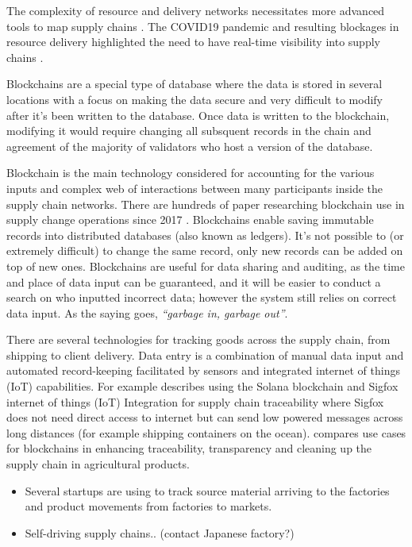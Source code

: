 \documentclass[
  letterpaper,
  DIV=11,
  numbers=noendperiod]{scrartcl}
\begin{document}
The complexity of resource and delivery networks necessitates more
advanced tools to map supply chains
\citep{knightFutureBusinessRole2022}. The COVID19 pandemic and resulting
blockages in resource delivery highlighted the need to have real-time
visibility into supply chains \citep{finkenstadtBlurryVisionSupply2021}.

Blockchains are a special type of database where the data is stored in
several locations with a focus on making the data secure and very
difficult to modify after it's been written to the database. Once data
is written to the blockchain, modifying it would require changing all
subsquent records in the chain and agreement of the majority of
validators who host a version of the database.

Blockchain is the main technology considered for accounting for the
various inputs and complex web of interactions between many participants
inside the supply chain networks. There are hundreds of paper
researching blockchain use in supply change operations since 2017
\citep{duttaBlockchainTechnologySupply2020}. Blockchains enable saving
immutable records into distributed databases (also known as ledgers).
It's not possible to (or extremely difficult) to change the same record,
only new records can be added on top of new ones. Blockchains are useful
for data sharing and auditing, as the time and place of data input can
be guaranteed, and it will be easier to conduct a search on who inputted
incorrect data; however the system still relies on correct data input.
As the saying goes, \emph{``garbage in, garbage out''}.

There are several technologies for tracking goods across the supply
chain, from shipping to client delivery. Data entry is a combination of
manual data input and automated record-keeping facilitated by sensors
and integrated internet of things (IoT) capabilities. For example
\citep{ashrafPrototypeSupplyChain2023} describes using the Solana
blockchain and Sigfox internet of things (IoT) Integration for supply
chain traceability where Sigfox does not need direct access to internet
but can send low powered messages across long distances (for example
shipping containers on the ocean).
\citep{vanwassenaerTokenizingCircularityAgrifood2023} compares use cases
for blockchains in enhancing traceability, transparency and cleaning up
the supply chain in agricultural products.

\begin{itemize}
\item
  Several startups are using to track source material arriving to the
  factories and product movements from factories to markets.
\item
  \citet{wagenvoortSelfdrivingSupplyChains2020} Self-driving supply
  chains.. (contact Japanese factory?)
\end{itemize}
\end{document}
